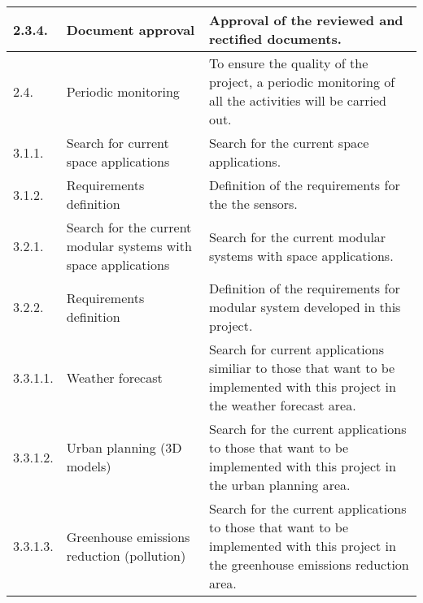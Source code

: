 \begin{longtable}[H]{l >{\raggedright\arraybackslash}p{4cm} p{8cm}}
	\midrule
	
	2.3.4. & Document approval & Approval of the reviewed and rectified documents.\vspace{0.2cm} \\
	
	\midrule
	
	2.4. & Periodic monitoring & To ensure the quality of the project, a periodic monitoring of all the activities will be carried out.\vspace{0.2cm} \\
	
	\midrule
	
	3.1.1. & Search for current space applications & Search for the current space applications.\vspace{0.2cm} \\
	
	\midrule
	
	3.1.2. & Requirements definition & Definition of the requirements for the the sensors.\vspace{0.2cm} \\

	\midrule
	
	3.2.1. & Search for the current modular systems with space applications & Search for the current modular systems with space applications.\vspace{0.2cm} \\
	
	\midrule
	
	3.2.2. & Requirements definition & Definition of the requirements for modular system developed in this project.\vspace{0.2cm} \\
	
	\midrule
	
	3.3.1.1. & Weather forecast & Search for current applications similiar to those that want to be implemented with this project in the weather forecast area.\vspace{0.2cm} \\
	
	\midrule
	
	3.3.1.2. & Urban planning (3D models) & Search for the current applications to those that want to be implemented with this project in the urban planning area.\vspace{0.2cm} \\
	
	\midrule
	
	3.3.1.3. & Greenhouse emissions reduction (pollution) & Search for the current applications to those that want to be implemented with this project in the greenhouse emissions reduction area.\vspace{0.2cm} \\
	

\end{longtable}
